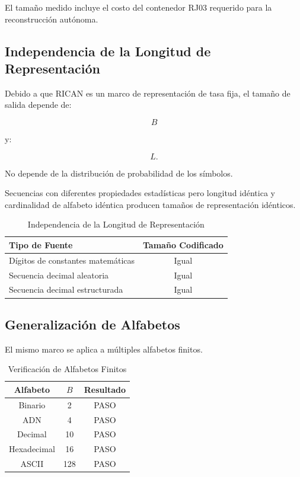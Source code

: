 \documentclass[onecolumn]{IEEEtran}
\begin{document}
El tamaño medido incluye el costo del contenedor RJ03 requerido para
la reconstrucción autónoma.

\subsection{Independencia de la Longitud de Representación}

Debido a que RICAN es un marco de representación de tasa fija, el
tamaño de salida depende de:

\[
B
\]

y:

\[
L .
\]

No depende de la distribución de probabilidad de los símbolos.

Secuencias con diferentes propiedades estadísticas pero longitud
idéntica y cardinalidad de alfabeto idéntica producen tamaños de
representación idénticos.

\begin{table}[!t]
\caption{Independencia de la Longitud de Representación}
\label{tab:independence}
\centering
\begin{tabular}{lc}
\toprule
Tipo de Fuente & Tamaño Codificado\\
\midrule
Dígitos de constantes matemáticas & Igual\\
Secuencia decimal aleatoria & Igual\\
Secuencia decimal estructurada & Igual\\
\bottomrule
\end{tabular}
\end{table}

\subsection{Generalización de Alfabetos}

El mismo marco se aplica a múltiples alfabetos finitos.

\begin{table}[!t]
\caption{Verificación de Alfabetos Finitos}
\label{tab:alphabet}
\centering
\begin{tabular}{ccc}
\toprule
Alfabeto & $B$ & Resultado\\
\midrule
Binario & 2 & PASO\\
ADN & 4 & PASO\\
Decimal & 10 & PASO\\
Hexadecimal &16& PASO\\
ASCII &128& PASO\\
\bottomrule
\end{tabular}
\end{table}
\end{document}
